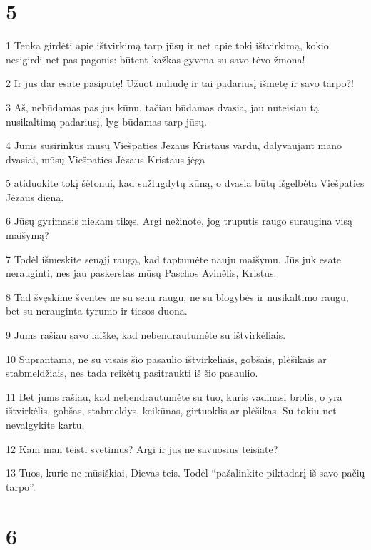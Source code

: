 \chapter{5}


\par 1 Tenka girdėti apie ištvirkimą tarp jūsų ir net apie tokį ištvirkimą, kokio nesigirdi net pas pagonis: būtent kažkas gyvena su savo tėvo žmona! 
\par 2 Ir jūs dar esate pasipūtę! Užuot nuliūdę ir tai padariusį išmetę ir savo tarpo?! 
\par 3 Aš, nebūdamas pas jus kūnu, tačiau būdamas dvasia, jau nuteisiau tą nusikaltimą padariusį, lyg būdamas tarp jūsų. 
\par 4 Jums susirinkus mūsų Viešpaties Jėzaus Kristaus vardu, dalyvaujant mano dvasiai, mūsų Viešpaties Jėzaus Kristaus jėga 
\par 5 atiduokite tokį šėtonui, kad sužlugdytų kūną, o dvasia būtų išgelbėta Viešpaties Jėzaus dieną. 
\par 6 Jūsų gyrimasis niekam tikęs. Argi nežinote, jog truputis raugo suraugina visą maišymą? 
\par 7 Todėl išmeskite senąjį raugą, kad taptumėte nauju maišymu. Jūs juk esate nerauginti, nes jau paskerstas mūsų Paschos Avinėlis, Kristus. 
\par 8 Tad švęskime šventes ne su senu raugu, ne su blogybės ir nusikaltimo raugu, bet su nerauginta tyrumo ir tiesos duona. 
\par 9 Jums rašiau savo laiške, kad nebendrautumėte su ištvirkėliais. 
\par 10 Suprantama, ne su visais šio pasaulio ištvirkėliais, gobšais, plėšikais ar stabmeldžiais, nes tada reikėtų pasitraukti iš šio pasaulio. 
\par 11 Bet jums rašiau, kad nebendrautumėte su tuo, kuris vadinasi brolis, o yra ištvirkėlis, gobšas, stabmeldys, keikūnas, girtuoklis ar plėšikas. Su tokiu net nevalgykite kartu. 
\par 12 Kam man teisti svetimus? Argi ir jūs ne savuosius teisiate? 
\par 13 Tuos, kurie ne mūsiškiai, Dievas teis. Todėl “pašalinkite piktadarį iš savo pačių tarpo”.


\chapter{6}


